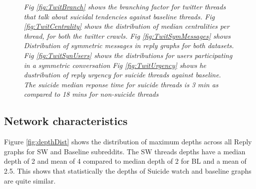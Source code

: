 \begin{figure}[!h]
    \caption{\textsl{ Fig \ref{fig:TwitBranch} shows the branching factor for twitter threads that talk about suicidal tendencies against baseline threads. Fig \ref{fig:TwitCentrality} shows the distribution of median centralities per thread, for both the twitter crawls. Fig \ref{fig:TwitSymMessages} shows Distribution of symmetric messages in reply graphs for both datasets. Fig \ref{fig:TwitSynUsers} shows the distributions for users participating in a symmetric conversation Fig \ref{fig:TwitUrgency} shows he dustribution of reply urgency for suicide threads against baseline. The suicide median reponse time for suicide threads is 3 min as compared to 18 mins for non-suicide threads}}
\end{figure}




\subsection{Network characteristics}
Figure \ref{fig:depthDist} shows the distribution of maximum depths across all Reply graphs for SW and Baseline subreddits. The SW threads depths have a median depth of 2 and mean of 4 compared to median depth of 2 for BL and a mean of 2.5. This shows that statistically the depths of Suicide watch and baseline graphs are quite similar.


